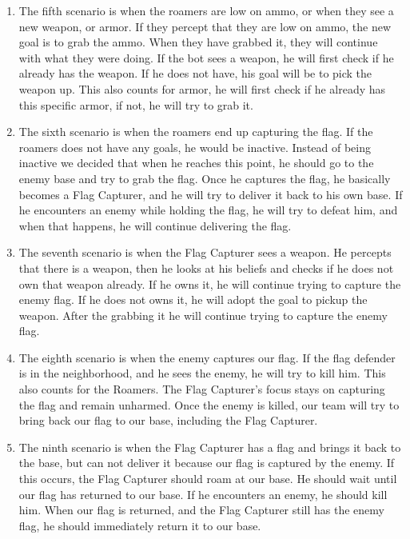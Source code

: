 \begin{enumerate}
	\item The fifth scenario is when the roamers are low on ammo, or when they see a new weapon, or armor. If they percept that they are low on ammo, the new goal is to grab the ammo. When they have grabbed it, they will continue with what they were doing. If the bot sees a weapon, he will first check if he already has the weapon. If he does not have, his goal will be to pick the weapon up. This also counts for armor, he will first check if he already has this specific armor, if not, he will try to grab it. \\
	\item The sixth scenario is when the roamers end up capturing the flag. If the roamers does not have any goals, he would be inactive. Instead of being inactive we decided that when he reaches this point, he should go to the enemy base and try to grab the flag. Once he captures the flag, he basically becomes a Flag Capturer, and he will try to deliver it back to his own base. If he encounters an enemy while holding the flag, he will try to defeat him, and when that happens, he will continue delivering the flag.\\ 
	\item The seventh scenario is when the Flag Capturer sees a weapon. He percepts that there is a weapon, then he looks at his beliefs and checks if he does not own that weapon already. If he owns it, he will continue trying to capture the enemy flag. If he does not owns it, he will adopt the goal to pickup the weapon. After the grabbing it he will continue trying to capture the enemy flag.\\
	\item The eighth scenario is when the enemy captures our flag. If the flag defender is in the neighborhood, and he sees the enemy, he will try to kill him. This also counts for the Roamers. The Flag Capturer's focus stays on capturing the flag and remain unharmed. Once the enemy is killed, our team will try to bring back our flag to our base, including the Flag Capturer. \\
	\item The ninth scenario is when the Flag Capturer has a flag and brings it back to the base, but can not deliver it because our flag is captured by the enemy. If this occurs, the Flag Capturer should roam at our base. He should wait until our flag has returned to our base. If he encounters an enemy, he should kill him. When our flag is returned, and the Flag Capturer still has the enemy flag, he should immediately return it to our base.\\

\end{enumerate}
